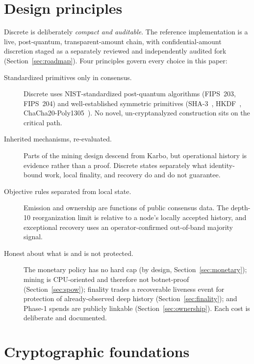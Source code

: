 \documentclass[11pt,a4paper]{article}
\begin{document}
\section{Design principles}\label{sec:principles}

Discrete is deliberately \emph{compact and auditable}. The reference
implementation is a live, post-quantum, transparent-amount chain, with confidential-amount
  discretion staged as a separately reviewed and independently audited fork
(Section~\ref{sec:roadmap}). Four principles govern every choice in this
paper:

\begin{description}
\item[Standardized primitives only in consensus.] Discrete uses
  NIST-standardized post-quantum algorithms (FIPS~203, FIPS~204) and
  well-established symmetric primitives (SHA-3~\cite{fips202},
  HKDF~\cite{rfc5869}, ChaCha20-Poly1305~\cite{rfc8439}). No novel,
  un-cryptanalyzed construction sits on the critical path.
\item[Inherited mechanisms, re-evaluated.] Parts of the mining design descend
  from Karbo, but operational history is evidence rather than a proof. Discrete
  states separately what identity-bound work, local finality, and recovery do
  and do not guarantee.
\item[Objective rules separated from local state.] Emission and ownership are
  functions of public consensus data. The depth-10 reorganization limit is
  relative to a node's locally accepted history, and exceptional recovery uses
  an operator-confirmed out-of-band majority signal.
\item[Honest about what is and is not protected.] The monetary policy has no
  hard cap (by design, Section~\ref{sec:monetary}); mining is CPU-oriented
  and therefore not botnet-proof (Section~\ref{sec:spow}); finality trades a
  recoverable liveness event for protection of already-observed deep history
  (Section~\ref{sec:finality}); and Phase-1 spends are publicly linkable
  (Section~\ref{sec:ownership}). Each cost is deliberate and documented.
\end{description}

\section{Cryptographic foundations}\label{sec:crypto}
\end{document}
